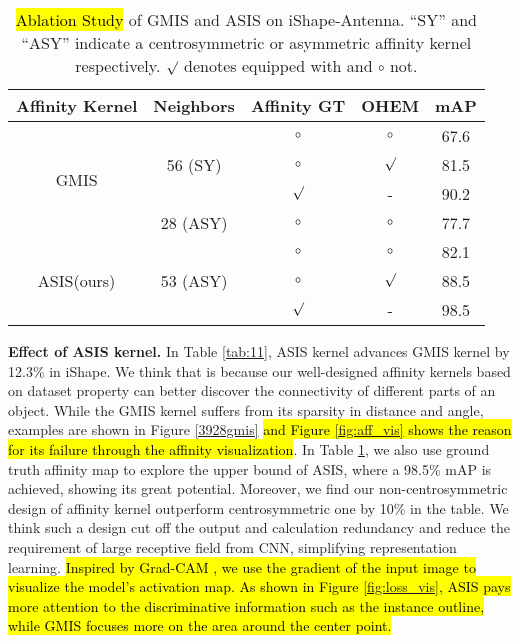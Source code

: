 \begin{table}[h]
\caption{\hl{Ablation Study} of GMIS and ASIS on iShape-Antenna. ``SY'' and ``ASY'' indicate a centrosymmetric or asymmetric affinity kernel respectively. $\surd$ denotes equipped with and $\circ$ not.}
    \centering
    \begin{tabular}{c|c|c|c|c}
    \toprule[1.5pt]
         
         
        Affinity Kernel & Neighbors & Affinity GT & OHEM & mAP \\
        \hline
        \multirow{4}{*}{GMIS \cite{liu2018affinity}} & \multirow{3}{*}{56 (SY)} & $\circ$ & $\circ$ & 67.6\\ \cline{3-5}
         & & $\circ$ & $\surd$ & 81.5 \\ \cline{3-5}
         & & $\surd$ &  - & 90.2 \\ 
        \cline{2-5}
         & 28 (ASY) & $\circ$ & $\circ $ & 77.7 \\
        \hline
        \multirow{3}{*}{ASIS(ours)} & \multirow{3}{*}{53 (ASY)} & $\circ$ & $\circ$ & 82.1\\
        \cline{3-5}
         & & $\circ$ & $\surd$ & 88.5 \\ \cline{3-5}
         & & $\surd$ & - & 98.5 \\ 
    \bottomrule[1.5pt]
    \end{tabular}
    \label{tab:ablation}
\end{table}


\textbf{Effect of ASIS kernel.} In Table \ref{tab:11}, ASIS kernel advances GMIS kernel by 12.3\% in iShape. We think that is because our well-designed affinity kernels based on dataset property can better discover the connectivity of different parts of an object. While the GMIS kernel suffers from its sparsity in distance and angle, examples are shown in Figure \ref{3928gmis} \hl{and Figure \ref{fig:aff_vis} shows the reason for its failure through the affinity visualization}. In Table \ref{tab:ablation}, we also use ground truth affinity map to explore the upper bound of ASIS, where a 98.5\% mAP is achieved, showing its great potential. Moreover, we find our non-centrosymmetric design of affinity kernel outperform centrosymmetric one by 10\% in the table. We think such a design cut off the output and calculation redundancy and reduce the requirement of large receptive field from CNN, simplifying representation learning. \hl{Inspired by Grad-CAM \cite{selvaraju2017grad}, we use the gradient of the input image to visualize the model's activation map. As shown in Figure \ref{fig:loss_vis}, ASIS pays more attention to the discriminative information such as the instance outline, while GMIS focuses more on the area around the center point.}

